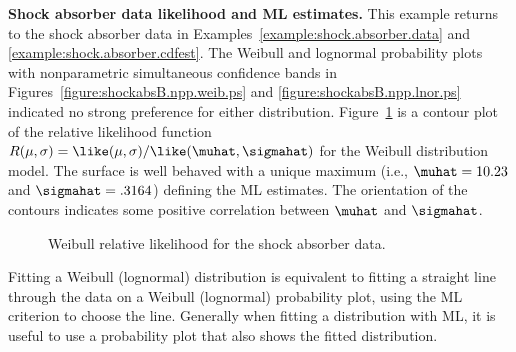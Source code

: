 \begin{example}
\label{example:shockabs.likelihood}
{\bf Shock absorber data likelihood and ML estimates.} This example
returns to the shock absorber data in
Examples~\ref{example:shock.absorber.data}
and \ref{example:shock.absorber.cdfest}.  The Weibull and
lognormal probability plots with nonparametric simultaneous confidence
bands in Figures~\ref{figure:shockabsB.npp.weib.ps} and
\ref{figure:shockabsB.npp.lnor.ps} indicated no strong preference for
either distribution.
Figure~\ref{figure:shockabsB.profcont.weib.ps}
is a contour plot of the
relative likelihood function
$R(\mu,\sigma)=\like(\mu,\sigma)/\like(\muhat,\sigmahat)$
for the Weibull distribution 
model. The surface is well behaved with a unique maximum
(i.e., $ \muhat = 10.23$ and $\sigmahat = .3164$)
defining the ML estimates.
The orientation of the contours indicates some
positive correlation between $\muhat$ and $\sigmahat$.
\begin{figure}
\caption{Weibull relative likelihood for the shock absorber data.}
\label{figure:shockabsB.profcont.weib.ps}
\end{figure}
\end{example}

Fitting a Weibull (lognormal) distribution is equivalent to fitting a
straight line through the data on a Weibull (lognormal) probability
plot, using the ML criterion to choose the line. Generally when
fitting a distribution with ML, it is useful to use a probability plot
that also shows the fitted distribution.

